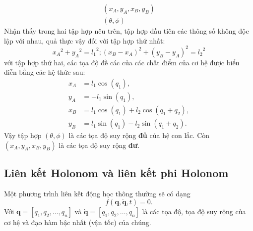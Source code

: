 \begin{align*}
    (x_A, y_A, x_B, y_B)\\
    (\theta, \phi)
\end{align*}
Nhận thấy trong hai tập hợp nêu trên, tập hợp đầu tiên các thông số không độc lập với nhau, quả thực vậy đối với tập hợp thứ nhất:
\begin{equation*}
    {x_A}^2+{y_A}^2 = {l_1}^2; {(x_B - x_A)}^2+{(y_B - y_A)}^2 = {l_2}^2
\end{equation*}
với tập hợp thứ hai, các tọa độ đề các của các chất điểm của cơ hệ được biểu diễn bằng các hệ thức sau:
\begin{align*}
    x_A &= l_1\cos \left( q_1 \right), \\
    y_A &= -l_1\sin \left( q_1 \right), \\
    x_B &= l_1\cos \left( q_1 \right) + l_2\cos \left( q_1+q_2 \right), \\
    y_B &= l_1\sin \left(q_1\right) - l_2\sin \left( q_1+q_2 \right).
\end{align*}
Vậy tập hợp $(\theta, \phi)$ là các tọa độ suy rộng \textbf{đủ} của hệ con lắc. Còn $(x_A, y_A, x_B, y_B)$ là các tọa độ suy rộng \textbf{dư}.

\subsection{Liên kết Holonom và liên kết phi Holonom}

Một phương trình liên kết động học thông thường sẽ có dạng
\begin{equation}
    f(\mathbf{q}, \mathbf{\dot{q}}, t) = 0.
\end{equation}
Với $\mathbf{q} = [q_1,q_2,\ldots,q_n]$ và $\mathbf{\dot{q}} = [\dot{q}_1,\dot{q}_2,\ldots,\dot{q}_n]$ là các tọa độ, tọa độ suy rộng của cơ hệ và đạo hàm bậc nhất (vận tốc) của chúng.

